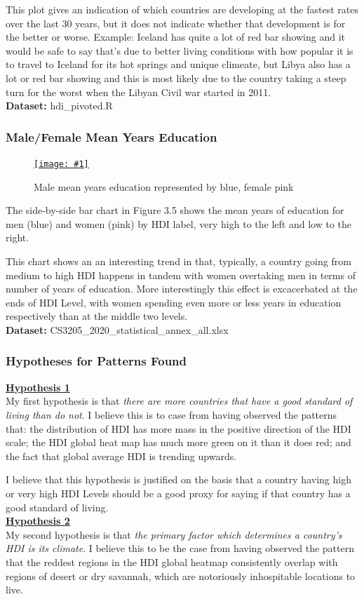 \documentclass[11pt,a4paper,final]{article}
\newcommand\onlinefig[3]{
\begin{figure}[H]
  \centering
  \href{#3}{\texttt{[image: \#1]}}
  \caption{#2} 
  \label{fig:#1}
\end{figure}
}
\begin{document}
\begin{multicols}{2}
This plot gives an indication of which countries are developing at the fastest rates over the last 30 years, but it does not indicate whether that development is for the better or worse. Example: Iceland has quite a lot of red bar showing and it would be safe to say that's due to better living conditions with how popular it is to travel to Iceland for its hot springs and unique climeate, but Libya also has a lot or red bar showing and this is most likely due to the country taking a steep turn for the worst when the Libyan Civil war started in 2011.
\\
\textbf{Dataset:} hdi\_pivoted.R

\subsubsection{Male/Female Mean Years Education}
\onlinefig{men_vs_women_mean_years_education_barchart}{Male mean years education represented by blue, female pink}{https://public.tableau.com/views/CS3205-HDI/Sheet2?:language=en-GB&:display_count=n&:origin=viz_share_link}

The side-by-side bar chart in Figure 3.5 shows the mean years of education for men (blue) and women (pink) by HDI label, very high to the left and low to the right.

This chart shows an an interesting trend in that, typically, a country going from medium to high HDI happens in tandem with women overtaking men in terms of number of years of education. More interestingly this effect is excacerbated at the ends of HDI Level, with women spending even more or less years in education respectively than at the middle two levels.
\\
\textbf{Dataset:} CS3205\_2020\_statistical\_annex\_all.xlsx

\subsubsection{Hypotheses for Patterns Found}
\underline{\textbf{Hypothesis 1}}
\\
My first hypothesis is that \emph{there are more countries that have a good standard of living than do not}. I believe this is to case from having observed the patterns that: the distribution of HDI has more mass in the positive direction of the HDI scale; the HDI global heat map has much more green on it than it does red; and the fact that global average HDI is trending upwards.

I believe that this hypothesis is justified on the basis that a country having high or very high HDI Levels should be a good proxy for saying if that country has a good standard of living.
\\
\underline{\textbf{Hypothesis 2}}
\\
My second hypothesis is that \emph{the primary factor which determines a country's HDI is its climate}. I believe this to be the case from having observed the pattern that the reddest regions in the HDI global heatmap consistently overlap with regions of desert or dry savannah, which are notoriously inhospitable locations to live.


\end{multicols}
\end{document}

